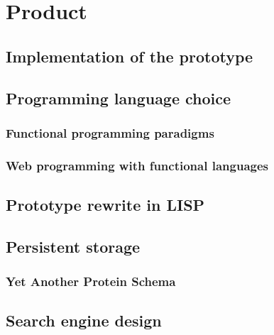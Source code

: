\chapter{Product}\label{chap:product}

\section{Implementation of the prototype}

\section{Programming language choice}


\subsection{Functional programming paradigms}


\subsection{Web programming with functional languages}


\section{Prototype rewrite in LISP}

\section{Persistent storage}
\subsection{Yet Another Protein Schema}

\section{Search engine design}

